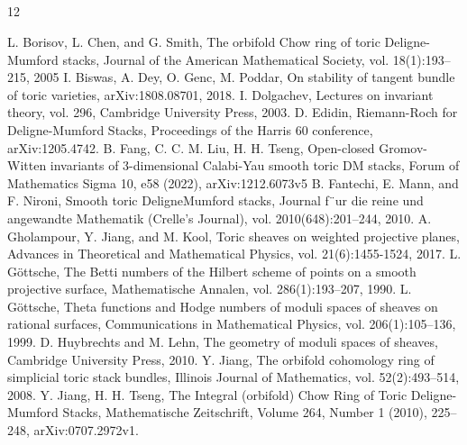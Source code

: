 \documentclass[10pt]{amsart}
\numberwithin{equation}{subsection}
\begin{document}
\subsection*{}
\begin{thebibliography}{12}  

 L. Borisov, L. Chen, and G. Smith, The orbifold Chow ring of toric Deligne-Mumford stacks, Journal of the American Mathematical
Society, vol. 18(1):193–215, 2005
 I. Biswas, A. Dey, O. Genc, M. Poddar, On stability of tangent bundle of toric varieties, arXiv:1808.08701, 2018.  
I. Dolgachev, Lectures on invariant theory, vol. 296, Cambridge University Press, 2003.
D. Edidin, \newblock Riemann-Roch for Deligne-Mumford Stacks,   Proceedings of the Harris 60 conference, arXiv:1205.4742.
B. Fang, C. C. M. Liu, H. H. Tseng, Open-closed Gromov-Witten invariants of 3-dimensional Calabi-Yau smooth toric DM stacks, Forum of Mathematics Sigma 10, e58 (2022), arXiv:1212.6073v5 
B. Fantechi, E. Mann, and F. Nironi, Smooth toric DeligneMumford stacks, Journal f¨ur die reine und angewandte Mathematik
(Crelle's Journal), vol. 2010(648):201–244, 2010.
 A. Gholampour, Y. Jiang, and M. Kool, Toric sheaves on weighted projective planes, Advances in Theoretical and Mathematical
Physics, vol. 21(6):1455-1524, 2017.
 L. G\"ottsche, The Betti numbers of the Hilbert scheme of points on a smooth projective surface, Mathematische Annalen, vol. 286(1):193–207, 1990.
L. G\"ottsche, Theta functions and Hodge numbers of moduli spaces of sheaves on rational surfaces, Communications in Mathematical
Physics, vol. 206(1):105–136, 1999.
 D. Huybrechts and M. Lehn, The geometry of moduli spaces of
sheaves, Cambridge University Press, 2010.
Y. Jiang, The orbifold cohomology ring of simplicial toric stack bundles, Illinois Journal of Mathematics, vol. 52(2):493–514, 2008.
Y. Jiang, H. H. Tseng, The Integral (orbifold) Chow Ring of Toric Deligne-Mumford Stacks, Mathematische Zeitschrift, Volume 264, Number 1 (2010), 225--248,  arXiv:0707.2972v1.

\end{thebibliography}
\end{document}
